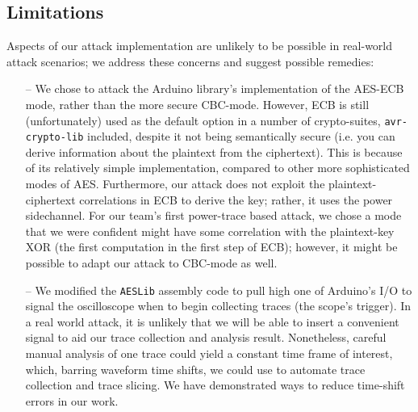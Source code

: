 \documentclass[journal]{ieee_style}
\begin{document}
\subsection{Limitations}
Aspects of our attack implementation are unlikely to be possible in real-world attack scenarios; we address these concerns and suggest possible remedies:
\begin{itemize}
    \item[--] We chose to attack the Arduino library's implementation of the AES-ECB mode, rather than the more secure CBC-mode. However, ECB is still (unfortunately) used as the default option in a number of crypto-suites, \texttt{avr-crypto-lib} included, despite it not being semantically secure (i.e. you can derive information about the plaintext from the ciphertext). This is because of its relatively simple implementation, compared to other more sophisticated modes of AES. Furthermore, our attack does not exploit the plaintext-ciphertext correlations in ECB to derive the key; rather, it uses the power sidechannel. For our team's first power-trace based attack, we chose a mode that we were confident might have some correlation with the plaintext-key XOR (the first computation in the first step of ECB); however, it might be possible to adapt our attack to CBC-mode as well.
    \item[--] We modified the \texttt{AESLib} assembly code to pull high one of Arduino's I/O to signal the oscilloscope when to begin collecting traces (the scope's trigger). In a real world attack, it is unlikely that we will be able to insert a convenient signal to aid our trace collection and analysis result. Nonetheless, careful manual analysis of one trace could yield a constant time frame of interest, which, barring waveform time shifts, we could use to automate trace collection and trace slicing. We have demonstrated ways to reduce time-shift errors in our work.
\end{itemize}
\end{document}
